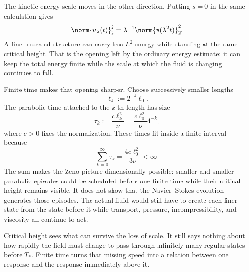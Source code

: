 The kinetic-energy scale moves in the other direction.
Putting \(s=0\) in the same calculation gives
\[
  \norm{u_\lambda(t)}_2^2
  =
  \lambda^{-1}
  \norm{u(\lambda^2t)}_2^2.
\]
A finer rescaled structure can carry less \(L^2\) energy while standing at the same critical height.
That is the opening left by the ordinary energy estimate: it can keep the total energy finite while the scale at which the fluid is changing continues to fall.

Finite time makes that opening sharper.
Choose successively smaller lengths
\[
  \ell_k
  :=
  2^{-k}\ell_0.
\]
The parabolic time attached to the \(k\)-th length has size
\[
  \tau_k
  :=
  \frac{c\ell_k^2}{\nu}
  =
  \frac{c\ell_0^2}{\nu}4^{-k},
\]
where \(c>0\) fixes the normalization.
These times fit inside a finite interval because
\[
  \sum_{k=0}^{\infty}\tau_k
  =
  \frac{4c\ell_0^2}{3\nu}
  <
  \infty.
\]
The sum makes the Zeno picture dimensionally possible: smaller and smaller parabolic episodes could be scheduled before one finite time while their critical height remains visible.
It does not show that the Navier--Stokes evolution generates those episodes.
The actual fluid would still have to create each finer state from the state before it while transport, pressure, incompressibility, and viscosity all continue to act.

Critical height sees what can survive the loss of scale.
It still says nothing about how rapidly the field must change to pass through infinitely many regular states before \(T_*\).
Finite time turns that missing speed into a relation between one response and the response immediately above it.
